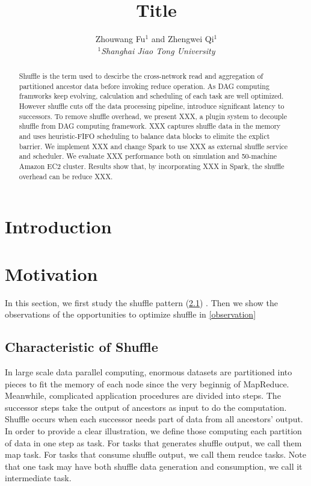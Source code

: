 \documentclass[10pt,twocolumn]{article}
\begin{document}
\title{Title}
\author{Zhouwang Fu$^1$ and Zhengwei Qi$^1$ \\
\small {\em  $^1$Shanghai Jiao Tong University} \\ [2mm]
}
\date{}
\maketitle

\begin{abstract}
Shuffle is the term used to descirbe the cross-network read and aggregation
of partitioned ancestor data before invoking reduce operation.
As DAG computing framworks keep evolving, calculation and scheduling of each task are well optimized. 
However shuffle cuts off the data processing pipeline, introduce significant latency to successors.
To remove shuffle overhead, we present XXX, a plugin system to decouple shuffle from DAG computing 
framework. XXX captures shuffle data in the memory and uses heuristic-FIFO scheduling to balance data
blocks to elimite the explict barrier. We implement XXX and change Spark to use XXX as external shuffle 
 service and scheduler. We evaluate XXX performance both on simulation and 50-machine Amazon EC2 cluster.
 Results show that, by incorporating XXX in Spark, the shuffle overhead can be reduce XXX.

\end{abstract}

\section{Introduction}

\section{Motivation}
In this section, we first study the shuffle pattern (\ref{shuffle pattern}) . 
Then we show the observations of the opportunities to optimize shuffle in \ref{observation}
\subsection{Characteristic of Shuffle} \label{shuffle pattern}

In large scale data parallel computing, enormous datasets are partitioned into pieces to fit the memory of each node since the very beginnig of MapReduce\cite{mapreduce}.
Meanwhile, complicated application procedures are divided into steps. The successor steps take the output of ancestors as input to do the computation. Shuffle occurs when each successor needs 
part of data from all ancestors' output. In order to provide a clear illustration, we define those computing each partition of data in one step as task. For tasks that generates shuffle output, we call
them map task. For tasks that consume shuffle output, we call them reudce tasks. Note that one task may have both shuffle data generation and consumption, we call it intermediate task.
\end{document}
